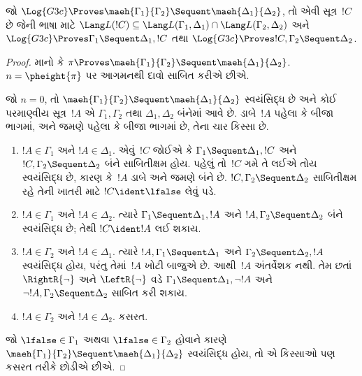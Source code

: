 \begin{lem}[માએહારાનું ઉપપ્રમેય]
જો $\Log{G3c}
\Proves \maeh{\Gamma_1}{\Gamma_2} \Sequent \maeh{\Delta_1}{\Delta_2}$,
તો એવી સૂત્ર~$!C$ છે
જેની ભાષા માટે
$\Lang L(!C)
\subseteq \Lang L(\Gamma_1,
\Delta_1) \cap \Lang L(\Gamma_2, \Delta_2)$
અને
$\Log{G3c} \Proves \Gamma_1 \Sequent \Delta_1, !C$
તથા
$\Log{G3c} \Proves !C,
\Gamma_2 \Sequent \Delta_2$.
\end{lem}

\begin{proof}
  માનો કે $\pi \Proves \maeh{\Gamma_1}{\Gamma_2} \Sequent
  \maeh{\Delta_1}{\Delta_2}$.
  $n=\pheight{\pi}$ પર આગમનથી
  દાવો સાબિત કરીએ છીએ.

  જો $n=0$, તો
  $\maeh{\Gamma_1}{\Gamma_2} \Sequent
  \maeh{\Delta_1}{\Delta_2}$
  સ્વયંસિદ્ધ છે અને કોઈ પરમાણ્વીય
  સૂત્ર~$!A$ એ
  $\Gamma_1, \Gamma_2$ તથા
  $\Delta_1, \Delta_2$ બંનેમાં આવે છે.
  ડાબે~$!A$ પહેલા કે બીજા ભાગમાં,
  અને જમણે પહેલા કે બીજા ભાગમાં છે,
  તેના ચાર કિસ્સા છે.
  \begin{enumerate}
    \item $!A \in \Gamma_1$ અને $!A \in \Delta_1$.
    એવું~$!C$ જોઈએ કે
    $\Gamma_1 \Sequent \Delta_1, !C$ અને
    $!C, \Gamma_2 \Sequent \Delta_2$
    બંને સાબિતીક્ષમ હોય.
    પહેલું તો~$!C$ ગમે તે લઈએ
    તોય સ્વયંસિદ્ધ છે, કારણ કે~$!A$
    ડાબે અને જમણે બંને છે.
    $!C, \Gamma_2 \Sequent \Delta_2$
    સાબિતીક્ષમ રહે તેની ખાતરી માટે
    $!C \ident \lfalse$ લેવું પડે.
    \item $!A \in \Gamma_1$ અને
    $!A \in \Delta_2$. ત્યારે
    $\Gamma_1 \Sequent \Delta_1, !A$
    અને $!A, \Gamma_2 \Sequent \Delta_2$
    બંને સ્વયંસિદ્ધ છે; તેથી
    $!C \ident !A$ લઈ શકાય.
    \item $!A \in \Gamma_2$ અને
    $!A \in \Delta_1$. ત્યારે
    $!A, \Gamma_1 \Sequent \Delta_1$
    અને $\Gamma_2 \Sequent \Delta_2, !A$
    સ્વયંસિદ્ધ હોય, પરંતુ તેમાં~$!A$
    ખોટી બાજુએ છે. આથી~$!A$
    અંતર્વેશક નથી. તેમ છતાં
    $\RightR{\lnot}$ અને
    $\LeftR{\lnot}$ વડે
    $\Gamma_1 \Sequent \Delta_1, \lnot!A$
    અને $\lnot !A, \Gamma_2 \Sequent \Delta_2$
    સાબિત કરી શકાય.
    \item $!A \in \Gamma_2$ અને
    $!A \in \Delta_2$. કસરત.
  \end{enumerate}
  જો $\lfalse \in \Gamma_1$
  અથવા $\lfalse \in \Gamma_2$
  હોવાને કારણે
  $\maeh{\Gamma_1}{\Gamma_2} \Sequent
  \maeh{\Delta_1}{\Delta_2}$
  સ્વયંસિદ્ધ હોય, તો એ કિસ્સાઓ
  પણ કસરત તરીકે છોડીએ છીએ.


\end{proof}
